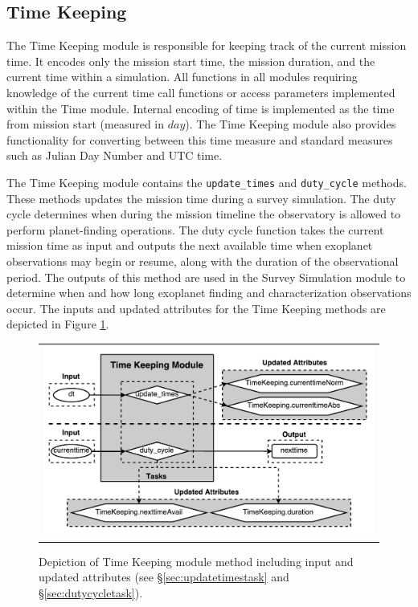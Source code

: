 \documentclass[cleanfoot]{asme2ej}
\newcommand{\reffig}[1]{Figure \ref{#1}}
\begin{document}

\subsection{Time Keeping} \label{sec:time}
The Time Keeping module is responsible for keeping track of the current mission time.  It encodes only the mission start time, the mission duration, and the current time within a simulation.  All functions in all modules requiring knowledge of the current time call functions or access parameters implemented within the Time module.  Internal encoding of time is implemented as the time from mission start (measured in $ day $).  The Time Keeping module also provides functionality for converting between this time measure and standard measures such as Julian Day Number and UTC time.
  
The Time Keeping module contains the \verb+update_times+ and \verb+duty_cycle+ methods.  These  methods updates the mission time during a survey simulation.  The duty cycle determines when during the mission timeline the observatory is allowed to perform planet-finding operations.  The duty cycle function takes the current mission time as input and outputs the next available time when exoplanet observations may begin or resume, along with the duration of the observational period. The outputs of this method are used in the Survey Simulation module to determine when and how long exoplanet finding and characterization observations occur.  The inputs and updated attributes for the Time Keeping methods are depicted in \reffig{fig:timekeepingmodule}.

\begin{figure}[ht]
    \begin{center}
        \begin{tabular}{c}
             \includegraphics[width=\textwidth]{TimeKeepingTasks}
        \end{tabular}
    \end{center}
    \caption{\label{fig:timekeepingmodule} Depiction of Time Keeping module method including input and updated attributes (see \S\ref{sec:updatetimestask} and \S\ref{sec:dutycycletask}).}
\end{figure}
\end{document}
